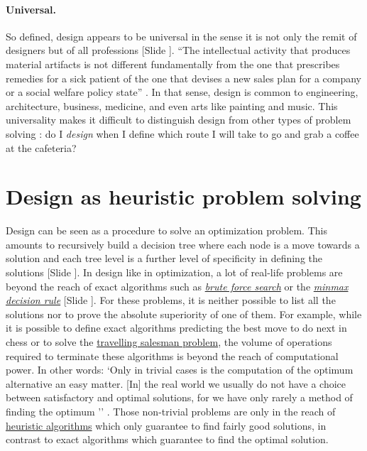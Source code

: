 \documentclass{article}
\newcounter{slide}
\begin{document}
\paragraph{Universal.} So defined, design appears to be universal in the sense it is not only the remit of designers but of all professions {\color{blue}[Slide ]}. ``The intellectual activity that produces material artifacts is not different fundamentally from the one that prescribes remedies for a sick patient of the one that devises a new sales plan for a company or a social welfare policy state'' \cite[p. 111]{simon1996sciences}. In that sense, design is common to engineering, architecture, business, medicine, and even arts like painting and music. This universality makes it difficult to distinguish design from other types of problem solving \cite{hatchuel2003new}: do I \emph{design} when I define which route I will take to go and grab a coffee at the cafeteria?

\section{Design as heuristic problem solving}
\label{sec:GeneralProblemSolving}
Design can be seen as a procedure to solve an optimization problem. This amounts to recursively build a decision tree where each node is a move towards a solution and each tree level is a further level of specificity in defining the solutions {\color{blue}[Slide ]}. In design like in optimization, a lot of real-life problems are beyond the reach of exact algorithms such as \emph{\href{https://en.wikipedia.org/wiki/Brute-force_search}{brute force search}} or the \emph{\href{https://en.wikipedia.org/wiki/Minimax}{minmax decision rule}} {\color{blue}[Slide ]}. For these problems, it is neither possible to list all the solutions nor to prove the absolute superiority of one of them. For example, while it is possible to define exact algorithms predicting the best move to do next in chess or to solve the \href{https://en.wikipedia.org/wiki/Travelling_salesman_problem}{travelling salesman problem}, the volume of operations required to terminate these algorithms is beyond the reach of computational power. In other words: `Only in trivial cases is the computation of the optimum alternative an easy matter. [In] the real world we usually do not have a choice between satisfactory and optimal solutions, for we have only rarely a method of finding the optimum '' \cite[p. 118-120]{simon1996sciences}. Those non-trivial problems are only in the reach of \href{https://en.wikipedia.org/wiki/Heuristic_(computer_science)}{heuristic algorithms} which only guarantee to find fairly good solutions, in contrast to exact algorithms which guarantee to find the optimal solution. 
\end{document}

